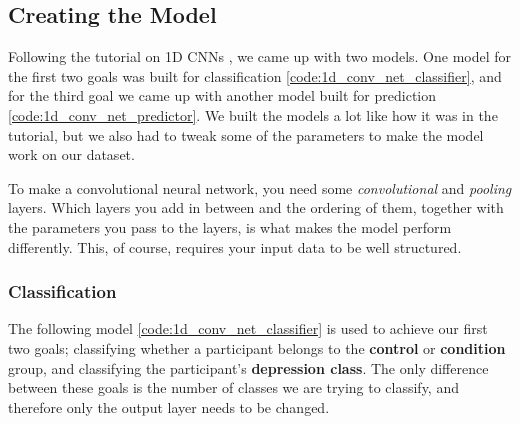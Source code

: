 \subsection{Creating the Model}
Following the tutorial on 1D CNNs \cite{1d_cnn}, we came up with two models. 
One model for the first two goals was built for classification \ref{code:1d_conv_net_classifier}, and for the third goal we came up with another model built for 
prediction \ref{code:1d_conv_net_predictor}. We built the models a lot like how it was in the tutorial, 
but we also had to tweak some of the parameters to make the model work on our dataset.

To make a convolutional neural network, you need some \textit{convolutional} and \textit{pooling} layers.
Which layers you add in between and the ordering of them, together with the parameters you pass to the layers, 
is what makes the model perform differently. This, of course, requires your input data to be well structured.

\subsubsection{Classification}
The following model \ref{code:1d_conv_net_classifier} is used to achieve our first two goals; classifying whether a 
participant belongs to the \textbf{control} or \textbf{condition} group, and classifying the participant's \textbf{depression class}.
The only difference between these goals is the number of classes we are trying to classify, and therefore only the output layer needs to be changed.

